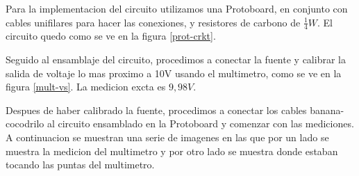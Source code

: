 \documentclass[a4paper,12pt, spanish]{report}
\begin{document}
      Para la implementacion del circuito utilizamos una Protoboard, en conjunto con cables unifilares para hacer 
      las conexiones, y resistores de carbono de $\tfrac{1}{4}W$. El circuito quedo como se ve en la figura 
      \ref{prot-crkt}.

      Seguido al ensamblaje del circuito, procedimos a conectar la fuente y calibrar la salida de voltaje lo mas
      proximo a 10V usando el multimetro, como se ve en la figura \ref{mult-vs}. La medicion excta es $9,98V$.

      Despues de haber calibrado la fuente, procedimos a conectar los cables banana-cocodrilo al circuito ensamblado
      en la Protoboard y comenzar con las mediciones. A continuacion se muestran una serie de imagenes en las que por
      un lado se muestra la medicion del multimetro y por otro lado se muestra donde estaban tocando las puntas del
      multimetro.
\end{document}
